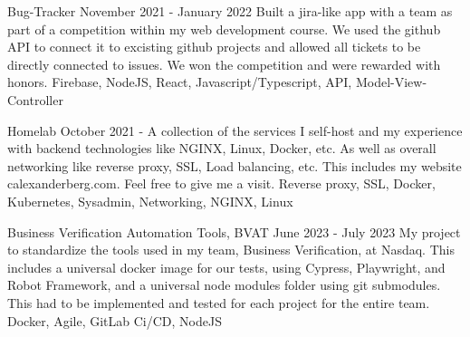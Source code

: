 \documentclass[../main.tex]{subfiles}
\begin{document}
\project
    {Bug-Tracker}
    {November 2021 - January 2022}
    {Built a jira-like app with a team as part of a competition within my web development course. We used the github API to connect it to excisting github projects and allowed all tickets to be directly connected to issues. We won the competition and were rewarded with honors.}
    {Firebase, NodeJS, React, Javascript/Typescript, API, Model-View-Controller}

\project
    {Homelab}
    {October 2021 -}
    {A collection of the services I self-host and my experience with backend technologies like NGINX, Linux, Docker, etc. As well as overall networking like reverse proxy, SSL, Load balancing, etc. This includes my website calexanderberg.com. Feel free to give me a visit.}
    {Reverse proxy, SSL, Docker, Kubernetes, Sysadmin, Networking, NGINX, Linux}


\project
    {Business Verification Automation Tools, BVAT}
    {June 2023 - July 2023}
    {My project to standardize the tools used in my team, Business Verification, at Nasdaq. This includes a universal docker image for our tests, using Cypress, Playwright, and Robot Framework, and a universal node modules folder using git submodules. This had to be implemented and tested for each project for the entire team.}
    {Docker, Agile, GitLab Ci/CD, NodeJS}
    
\end{document}

